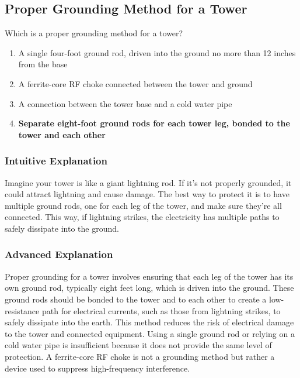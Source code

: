 \subsection{Proper Grounding Method for a Tower}
\label{T0B08}

\begin{tcolorbox}[colback=gray!10!white,colframe=black!75!black,title=T0B08]
Which is a proper grounding method for a tower?
\begin{enumerate}[noitemsep]
    \item A single four-foot ground rod, driven into the ground no more than 12 inches from the base
    \item A ferrite-core RF choke connected between the tower and ground
    \item A connection between the tower base and a cold water pipe
    \item \textbf{Separate eight-foot ground rods for each tower leg, bonded to the tower and each other}
\end{enumerate}
\end{tcolorbox}

\subsubsection*{Intuitive Explanation}
Imagine your tower is like a giant lightning rod. If it's not properly grounded, it could attract lightning and cause damage. The best way to protect it is to have multiple ground rods, one for each leg of the tower, and make sure they're all connected. This way, if lightning strikes, the electricity has multiple paths to safely dissipate into the ground.

\subsubsection*{Advanced Explanation}
Proper grounding for a tower involves ensuring that each leg of the tower has its own ground rod, typically eight feet long, which is driven into the ground. These ground rods should be bonded to the tower and to each other to create a low-resistance path for electrical currents, such as those from lightning strikes, to safely dissipate into the earth. This method reduces the risk of electrical damage to the tower and connected equipment. Using a single ground rod or relying on a cold water pipe is insufficient because it does not provide the same level of protection. A ferrite-core RF choke is not a grounding method but rather a device used to suppress high-frequency interference.